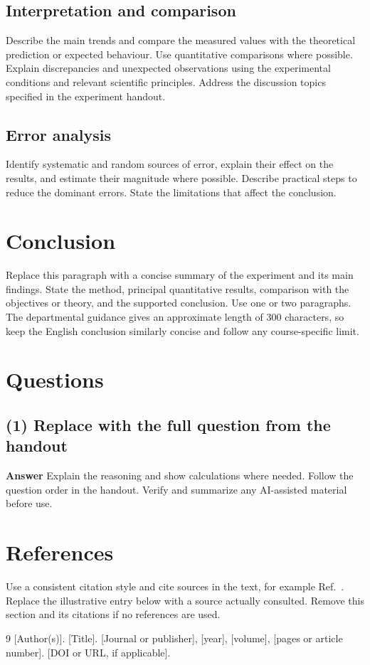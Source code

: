 \documentclass[12pt,a4paper]{article}
\begin{document}
\subsection{Interpretation and comparison}
Describe the main trends and compare the measured values with the theoretical
prediction or expected behaviour. Use quantitative comparisons where possible.
Explain discrepancies and unexpected observations using the experimental
conditions and relevant scientific principles. Address the discussion topics
specified in the experiment handout.

\subsection{Error analysis}
Identify systematic and random sources of error, explain their effect on the
results, and estimate their magnitude where possible. Describe practical steps
to reduce the dominant errors. State the limitations that affect the conclusion.

\section{Conclusion}
Replace this paragraph with a concise summary of the experiment and its main
findings. State the method, principal quantitative results, comparison with the
objectives or theory, and the supported conclusion. Use one or two paragraphs.
The departmental guidance gives an approximate length of 300 characters, so
keep the English conclusion similarly concise and follow any course-specific limit.

\section{Questions}
\subsection*{(1) Replace with the full question from the handout}
\noindent\textbf{Answer}\quad
Explain the reasoning and show calculations where needed. Follow the question
order in the handout. Verify and summarize any AI-assisted material before use.

\section{References}
Use a consistent citation style and cite sources in the text, for example
Ref.~\cite{replace-source}. Replace the illustrative entry below with a source
actually consulted. Remove this section and its citations if no references are used.
\begingroup
\renewcommand{\section}[2]{}%
\begin{thebibliography}{9}
[Author(s)]. [Title]. [Journal or publisher], [year], [volume], [pages or article number].
[DOI or URL, if applicable].
\end{thebibliography}
\endgroup
\end{document}
